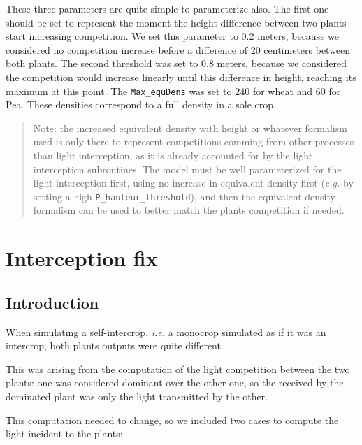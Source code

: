 \documentclass[
]{book}
\begin{document}
These three parameters are quite simple to parameterize also. The first one should be set to represent the moment the height difference between two plants start increasing competition. We set this parameter to 0.2 meters, because we considered no competition increase before a difference of 20 centimeters between both plants. The second threshold was set to 0.8 meters, because we considered the competition would increase linearly until this difference in height, reaching its maximum at this point. The \texttt{Max\_equDens} was set to 240 for wheat and 60 for Pea. These densities correspond to a full density in a sole crop.

\begin{quote}
Note: the increased equivalent density with height or whatever formalism used is only there to represent competitions comming from other processes than light interception, as it is already accounted for by the light interception subroutines. The model must be well parameterized for the light interception first, using no increase in equivalent density first (\emph{e.g.} by setting a high \texttt{P\_hauteur\_threshold}), and then the equivalent density formalism can be used to better match the plants competition if needed.
\end{quote}

\hypertarget{intercfix}{%
\chapter{Interception fix}\label{intercfix}}

\hypertarget{introduction-12}{%
\section{Introduction}\label{introduction-12}}

When simulating a self-intercrop, \emph{i.e.} a monocrop simulated as if it was an intercrop, both plants outputs were quite different.

This was arising from the computation of the light competition between the two plants: one was considered dominant over the other one, so the received by the dominated plant was only the light transmitted by the other.

This computation needed to change, so we included two cases to compute the light incident to the plants:
\end{document}
